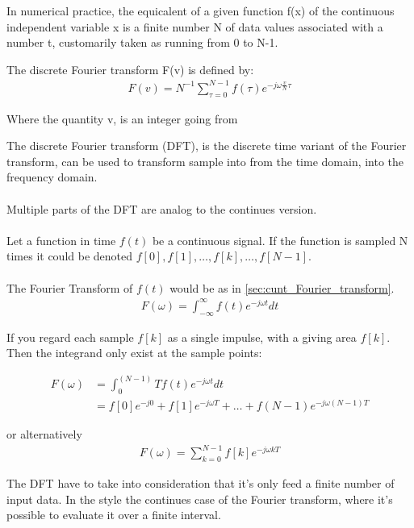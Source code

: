 In numerical practice, the equicalent of a given function f(x) of the continuous independent variable x is a finite number N of data values associated with a number t, customarily taken as running from 0 to N-1.

The discrete Fourier transform F(v) is defined by:
\begin{align*}
	F(v)= N^{-1}\sum_{\tau = 0}^{N-1}f(\tau)e^{-j \omega \frac{v}{N}\tau}
\end{align*}

Where the quantity v, is an integer going from %

The discrete Fourier transform (DFT), is the discrete time variant of the Fourier transform, can be used to transform sample into from the time domain, into the frequency domain.
\\\\
Multiple parts of the DFT are analog to the continues version.
\\\\
Let a function in time $f(t)$ be a continuous signal.
If the function is sampled N times it could be denoted
$f[0],f[1],\dots,f[k],\dots,f[N-1]$.
\\\\
The Fourier Transform of $f(t)$ would be as in \ref{sec:cunt_Fourier_transform}.
\begin{align*}
	F(\omega) = \int_{-\infty}^\infty f(t)e^{-j\omega t} dt
\end{align*}

If you regard each sample $f[k]$ as a single impulse, with a giving area $f[k]$. Then the integrand only exist at the sample points:

\begin{align*}
	F(\omega) 
	&= \int_0^(N-1)T f(t) e^{-j\omega t}dt\\
	&= f[0]e^{-j0} + f[1]e^{-j\omega T} + \dots + f(N-1) e^{-j\omega(N-1)T}	
\end{align*}

or alternatively
\begin{align*}
	F(\omega) = \sum_{k=0}^{N-1}f[k]e^{-j\omega k T}
\end{align*} 


The DFT have to take into consideration that it's only feed a finite number of input data. 
In the style the continues case of the Fourier transform, where it's possible to evaluate it over a finite interval.

